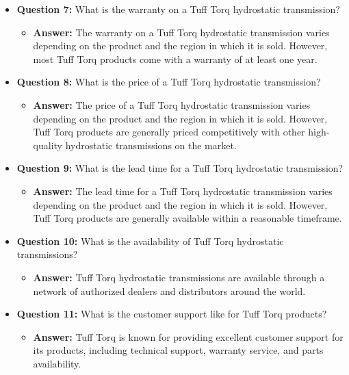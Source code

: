 \documentclass{article}
\begin{document}
\begin{itemize}
    \item \textbf{Question 7:} What is the warranty on a Tuff Torq hydrostatic transmission?
    \begin{itemize}
        \item \textbf{Answer:} The warranty on a Tuff Torq hydrostatic transmission varies depending on the product and the region in which it is sold. However, most Tuff Torq products come with a warranty of at least one year.
    \end{itemize}
    
    \item \textbf{Question 8:} What is the price of a Tuff Torq hydrostatic transmission?
    \begin{itemize}
        \item \textbf{Answer:} The price of a Tuff Torq hydrostatic transmission varies depending on the product and the region in which it is sold. However, Tuff Torq products are generally priced competitively with other high-quality hydrostatic transmissions on the market.
    \end{itemize}
    
    \item \textbf{Question 9:} What is the lead time for a Tuff Torq hydrostatic transmission?
    \begin{itemize}
        \item \textbf{Answer:} The lead time for a Tuff Torq hydrostatic transmission varies depending on the product and the region in which it is sold. However, Tuff Torq products are generally available within a reasonable timeframe.
    \end{itemize}
    
    \item \textbf{Question 10:} What is the availability of Tuff Torq hydrostatic transmissions?
    \begin{itemize}
        \item \textbf{Answer:} Tuff Torq hydrostatic transmissions are available through a network of authorized dealers and distributors around the world.
    \end{itemize}
    
    \item \textbf{Question 11:} What is the customer support like for Tuff Torq products?
    \begin{itemize}
        \item \textbf{Answer:} Tuff Torq is known for providing excellent customer support for its products, including technical support, warranty service, and parts availability.
    \end{itemize}
    

\end{itemize}
\end{document}
